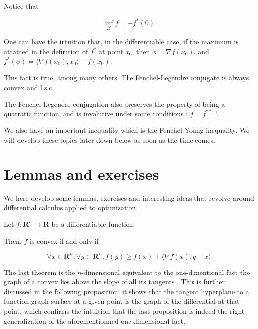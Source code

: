 \begin{proposition}
    Notice that

    \[
        \inf_{\mathcal X} f = - f^*(0)
    \]
\end{proposition}

\begin{remark}
    One can have the intuition that, in the differentiable case, if the maximum is attained in the definition of $ f^* $ at point $ x_0 $, then $ \phi = \nabla f(x_0) $, and $ f^*(\phi) = \langle \nabla f(x_0), x_0 \rangle - f(x_0) $.

    This fact is true, among many others. The Fenchel-Legendre conjugate is always convex and l.s.c. 

    The Fenchel-Legendre conjugation also preserves the property of being a quatratic function, and is involutive under some conditions : $ f = f^{**} $ !

    We also have an important inequality which is the Fenchel-Young inequality. We will develop these topics later down below as soon as the time comes.
\end{remark}

\section{Lemmas and exercises}

We here develop some lemmas, exercises and interesting ideas that revolve around differential calculus applied to optimization.

\begin{proposition}
    Let $ f : \mathbf R^n \to \mathbf R $ be a differentiable function.

    Then, $ f $ is convex if and only if

    \[
        \forall x \in \mathbf R^n, \forall y \in \mathbf R^n, f(y) \geqslant f(x) + \langle \nabla f(x), y - x \rangle
    \]
\end{proposition}

\begin{remark}
    The last theorem is the $n$-dimensional equivalent to the one-dimentional fact \og the graph of a convex lies above the slope of all its tangents \fg. This is further discussed in the following proposition: it shows that the tangent hyperplane to a function graph surface at a given point is the graph of the differential at that point, which confirms the intuition that the last proposition is indeed the right generalization of the aforementionned one-dimensional fact.
\end{remark}

